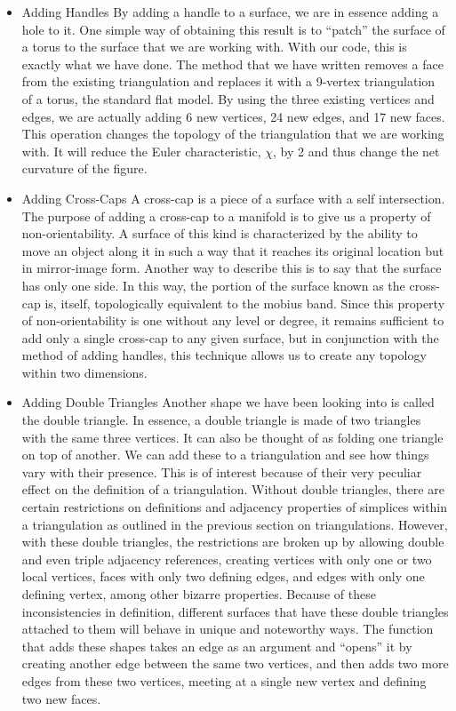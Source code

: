 \documentclass[12pt]{article}
\begin{document}
\begin{itemize}
\item Adding Handles \newline
By adding a handle to a surface, we are in essence adding a hole to it. One simple way of obtaining this result is to ``patch'' the surface of a torus to the surface that we are working with. With our code, this is exactly what we have done. The method that we have written removes a face from the existing triangulation and replaces it with a 9-vertex triangulation of a torus, the standard flat model. By using the three existing vertices and edges, we are actually adding 6 new vertices, 24 new edges, and 17 new faces. This operation changes the topology of the triangulation that we are working with. It will reduce the Euler characteristic, $\chi$, by 2 and thus change the net curvature of the figure.
\item Adding Cross-Caps \newline
A cross-cap is a piece of a surface with a self intersection. The purpose of adding a cross-cap to a manifold is to give us a property of non-orientability. A surface of this kind is characterized by the ability to move an object along it in such a way that it reaches its original location but in mirror-image form. Another way to describe this is to say that the surface has only one side. In this way, the portion of the surface known as the cross-cap is, itself, topologically equivalent to the mobius band. Since this property of non-orientability is one without any level or degree, it remains sufficient to add only a single cross-cap to any given surface, but in conjunction with the method of adding handles, this technique allows us to create any topology within two dimensions.
\item Adding Double Triangles \newline
Another shape we have been looking into is called the double triangle. In essence, a double triangle is made of two triangles with the same three vertices. It can also be thought of as folding one triangle on top of another. We can add these to a triangulation and see how things vary with their presence. This is of interest because of their very peculiar effect on the definition of a triangulation. Without double triangles, there are certain restrictions on definitions and adjacency properties of simplices within a triangulation as outlined in the previous section on triangulations. However, with these double triangles, the restrictions are broken up by allowing double and even triple adjacency references, creating vertices with only one or two local vertices, faces with only two defining edges, and edges with only one defining vertex, among other bizarre properties. Because of these inconsistencies in definition, different surfaces that have these double triangles attached to them will behave in unique and noteworthy ways. The function that adds these shapes takes an edge as an argument and ``opens'' it by creating another edge between the same two vertices, and then adds two more edges from these two vertices, meeting at a single new vertex and defining two new faces.
\end{itemize}
\end{document}
